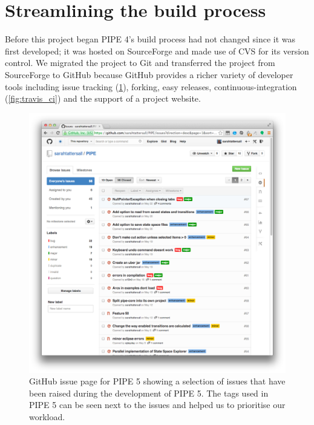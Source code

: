 \section{Streamlining the build process}
Before this project began PIPE 4's build process had not changed since it was first developed; it was hosted on SourceForge and made use of CVS for its version control. We migrated the project to Git and transferred the project from SourceForge to GitHub because GitHub provides a richer variety of developer tools including issue tracking (\cref{fig:gh_issues}), forking, easy releases, continuous-integration (\cref{fig:travis_ci}) and the support of a project website.

\mediumlinespacing
\begin{figure}[tb]
\begin{center}
    \includegraphics[width=\linewidth]{build/gh_issues.png} 
    \caption{GitHub issue page for PIPE 5 showing a selection of issues that have been raised during the development of PIPE 5. The tags used in PIPE 5 can be seen next to the issues and helped us to prioritise our workload.}
    \label{fig:gh_issues}
\end{center}
\end{figure}


